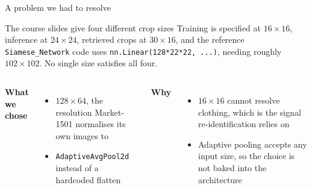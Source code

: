 \documentclass[aspectratio=169,11pt]{beamer}
\begin{document}
\begin{frame}{A problem we had to resolve}
  \begin{alertblock}{The course slides give four different crop sizes}
    {\small Training is specified at $16\times16$, inference at $24\times24$,
    retrieved crops at $30\times16$, and the reference \texttt{Siamese\_Network}
    code uses \texttt{nn.Linear(128*22*22, ...)}, needing roughly
    $102\times102$. No single size satisfies all four.}
  \end{alertblock}
  \vspace{0.7em}

  \begin{columns}[T,onlytextwidth]
      \textbf{What we chose}
      \begin{itemize}\small
        \item $128\times64$, the resolution Market-1501 normalises its own
              images to
        \item \texttt{AdaptiveAvgPool2d} instead of a hardcoded flatten
      \end{itemize}
      \textbf{Why}
      \begin{itemize}\small
        \item $16\times16$ cannot resolve clothing, which is the signal
              re-identification relies on
        \item Adaptive pooling accepts any input size, so the choice is not
              baked into the architecture
      \end{itemize}
  \end{columns}
\end{frame}
\end{document}
